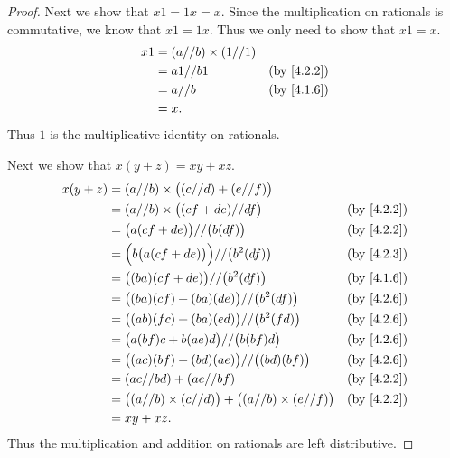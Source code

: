 \begin{proof}
  Next we show that \(x1 = 1x = x\).
  Since the multiplication on rationals is commutative, we know that \(x1 = 1x\).
  Thus we only need to show that \(x1 = x\).
  \begin{align*}
    x1 & = (a // b) \times (1 // 1)                            \\
       & = a1 // b1                 & \text{(by \cref{4.2.2})} \\
       & = a // b                   & \text{(by \cref{4.1.6})} \\
       & = x.
  \end{align*}
  Thus \(1\) is the multiplicative identity on rationals.

  Next we show that \(x(y + z) = xy + xz\).
  \begin{align*}
    x(y + z) & = (a // b) \times \big((c // d) + (e // f)\big)                                                      \\
             & = (a // b) \times \big((cf + de) // df\big)                               & \text{(by \cref{4.2.2})} \\
             & = \big(a(cf + de)\big) // \big(b(df)\big)                                 & \text{(by \cref{4.2.2})} \\
             & = \Big(b\big(a(cf + de)\big)\Big) // \big(b^2(df)\big)                    & \text{(by \cref{4.2.3})} \\
             & = \big((ba)(cf + de)\big) // \big(b^2(df)\big)                            & \text{(by \cref{4.1.6})} \\
             & = \big((ba)(cf) + (ba)(de)\big) // \big(b^2(df)\big)                      & \text{(by \cref{4.2.6})} \\
             & = \big((ab)(fc) + (ba)(ed)\big) // \big(b^2(fd)\big)                      & \text{(by \cref{4.2.6})} \\
             & = \big(a(bf)c + b(ae)d\big) // \big(b(bf)d\big)                           & \text{(by \cref{4.2.6})} \\
             & = \big((ac)(bf) + (bd)(ae)\big) // \big((bd)(bf)\big)                     & \text{(by \cref{4.2.6})} \\
             & = (ac // bd) + (ae // bf)                                                 & \text{(by \cref{4.2.2})} \\
             & = \big((a // b) \times (c // d)\big) + \big((a // b) \times (e // f)\big) & \text{(by \cref{4.2.2})} \\
             & = xy + xz.
  \end{align*}
  Thus the multiplication and addition on rationals are left distributive.


\end{proof}

